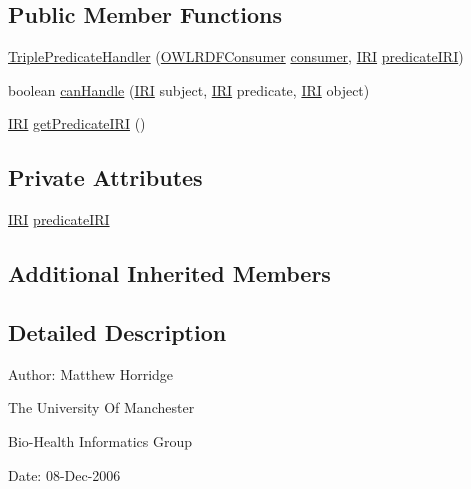 \subsection*{Public Member Functions}
\begin{DoxyCompactItemize}
\item 
\hyperlink{classorg_1_1coode_1_1owlapi_1_1rdfxml_1_1parser_1_1_triple_predicate_handler_a862d523b7098a9474352a7f668537215}{Triple\-Predicate\-Handler} (\hyperlink{classorg_1_1coode_1_1owlapi_1_1rdfxml_1_1parser_1_1_o_w_l_r_d_f_consumer}{O\-W\-L\-R\-D\-F\-Consumer} \hyperlink{classorg_1_1coode_1_1owlapi_1_1rdfxml_1_1parser_1_1_abstract_triple_handler_a4ccf4d898ff01eb1cadfa04b23d54e9c}{consumer}, \hyperlink{classorg_1_1semanticweb_1_1owlapi_1_1model_1_1_i_r_i}{I\-R\-I} \hyperlink{classorg_1_1coode_1_1owlapi_1_1rdfxml_1_1parser_1_1_triple_predicate_handler_a9d6bb836fac09ff7f53774459cb67109}{predicate\-I\-R\-I})
\item 
boolean \hyperlink{classorg_1_1coode_1_1owlapi_1_1rdfxml_1_1parser_1_1_triple_predicate_handler_ad8520e7a0c1861dc083cdaf17cd56a7b}{can\-Handle} (\hyperlink{classorg_1_1semanticweb_1_1owlapi_1_1model_1_1_i_r_i}{I\-R\-I} subject, \hyperlink{classorg_1_1semanticweb_1_1owlapi_1_1model_1_1_i_r_i}{I\-R\-I} predicate, \hyperlink{classorg_1_1semanticweb_1_1owlapi_1_1model_1_1_i_r_i}{I\-R\-I} object)
\item 
\hyperlink{classorg_1_1semanticweb_1_1owlapi_1_1model_1_1_i_r_i}{I\-R\-I} \hyperlink{classorg_1_1coode_1_1owlapi_1_1rdfxml_1_1parser_1_1_triple_predicate_handler_ad563744dc591181e19c2e5a7db0352ca}{get\-Predicate\-I\-R\-I} ()
\end{DoxyCompactItemize}
\subsection*{Private Attributes}
\begin{DoxyCompactItemize}
\item 
\hyperlink{classorg_1_1semanticweb_1_1owlapi_1_1model_1_1_i_r_i}{I\-R\-I} \hyperlink{classorg_1_1coode_1_1owlapi_1_1rdfxml_1_1parser_1_1_triple_predicate_handler_a9d6bb836fac09ff7f53774459cb67109}{predicate\-I\-R\-I}
\end{DoxyCompactItemize}
\subsection*{Additional Inherited Members}


\subsection{Detailed Description}
Author\-: Matthew Horridge\par
 The University Of Manchester\par
 Bio-\/\-Health Informatics Group\par
 Date\-: 08-\/\-Dec-\/2006\par
\par
 

